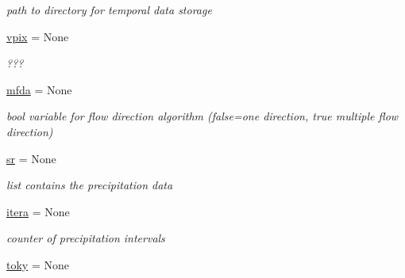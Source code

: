 \begin{DoxyCompactItemize}
\begin{DoxyCompactList}\small\item\em path to directory for temporal data storage \end{DoxyCompactList}\item 
\hypertarget{classmain__src_8old_1_1main__classes_1_1General_1_1Globals_a64a8610fd0862aee4850c132a38ad26c}{\hyperlink{classmain__src_8old_1_1main__classes_1_1General_1_1Globals_a64a8610fd0862aee4850c132a38ad26c}{vpix} = None}\label{classmain__src_8old_1_1main__classes_1_1General_1_1Globals_a64a8610fd0862aee4850c132a38ad26c}

\begin{DoxyCompactList}\small\item\em ??? \end{DoxyCompactList}\item 
\hypertarget{classmain__src_8old_1_1main__classes_1_1General_1_1Globals_a274f08fa2cd52e9a69003fb8b3b9880b}{\hyperlink{classmain__src_8old_1_1main__classes_1_1General_1_1Globals_a274f08fa2cd52e9a69003fb8b3b9880b}{mfda} = None}\label{classmain__src_8old_1_1main__classes_1_1General_1_1Globals_a274f08fa2cd52e9a69003fb8b3b9880b}

\begin{DoxyCompactList}\small\item\em bool variable for flow direction algorithm (false=one direction, true multiple flow direction) \end{DoxyCompactList}\item 
\hypertarget{classmain__src_8old_1_1main__classes_1_1General_1_1Globals_aa9b209ddbd04234a3a711e530475f1cf}{\hyperlink{classmain__src_8old_1_1main__classes_1_1General_1_1Globals_aa9b209ddbd04234a3a711e530475f1cf}{sr} = None}\label{classmain__src_8old_1_1main__classes_1_1General_1_1Globals_aa9b209ddbd04234a3a711e530475f1cf}

\begin{DoxyCompactList}\small\item\em list contains the precipitation data \end{DoxyCompactList}\item 
\hypertarget{classmain__src_8old_1_1main__classes_1_1General_1_1Globals_ad331b202e13d85571688d7439ff3573e}{\hyperlink{classmain__src_8old_1_1main__classes_1_1General_1_1Globals_ad331b202e13d85571688d7439ff3573e}{itera} = None}\label{classmain__src_8old_1_1main__classes_1_1General_1_1Globals_ad331b202e13d85571688d7439ff3573e}

\begin{DoxyCompactList}\small\item\em counter of precipitation intervals \end{DoxyCompactList}\item 
\hypertarget{classmain__src_8old_1_1main__classes_1_1General_1_1Globals_a331af66db74a963ffa004802c632f467}{\hyperlink{classmain__src_8old_1_1main__classes_1_1General_1_1Globals_a331af66db74a963ffa004802c632f467}{toky} = None}\label{classmain__src_8old_1_1main__classes_1_1General_1_1Globals_a331af66db74a963ffa004802c632f467}


\end{DoxyCompactItemize}
